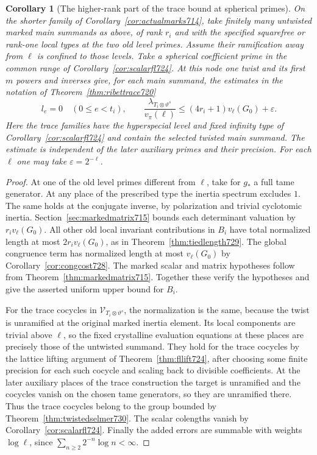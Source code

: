 \documentclass[a4paper,11pt]{article}
\newtheorem{corollary}[proposition]{Corollary}
\theoremstyle{definition}
\theoremstyle{remark}
\numberwithin{equation}{section}
\begin{document}
\begin{corollary}[The higher-rank part of the trace bound at spherical primes]
\leavevmode\label{cor:maincost730}
On the shorter family of Corollary~\ref{cor:actualmarks714}, take
finitely many untwisted marked main summands as above, of rank \(r_i\)
and with the specified squarefree or rank-one local types at the two
old level primes. Assume their ramification away from \(\ell\) is
confined to those levels. Take a spherical coefficient prime in
the common range of Corollary~\ref{cor:scalarfl724}. At this node
one twist and its first \(m\) powers and inverses give, for each main
summand, the estimates in the notation of Theorem~\ref{thm:ribettrace720}
\[
    l_e=0\quad(0\le e<t_i),\qquad
    \frac{\lambda_{T_i\otimes\vartheta^s}}{v_\pi(\ell)}
             \le (4r_i+1)v_\ell(G_0)+\varepsilon .
\]
Here the trace families have the hyperspecial level and fixed
infinity type of Corollary~\ref{cor:scalarfl724} and contain the
selected twisted main summand. The estimate is independent of the
later auxiliary primes and their precision. For each \(\ell\) one
may take \(\varepsilon=2^{-\ell}\).
\end{corollary}
\begin{proof}
At one of the old level primes different from \(\ell\), take for
\(g_*\) a full tame generator. At any place of the prescribed type
the inertia spectrum excludes \(1\). The same holds at the
conjugate inverse, by polarization and trivial cyclotomic inertia.
Section~\ref{sec:markedmatrix715} bounds each determinant valuation
by \(r_i v_\ell(G_0)\). All other old local invariant contributions
in \(B_i\) have total normalized length at most
\(2r_i v_\ell(G_0)\), as in Theorem~\ref{thm:tiedlength729}.
The global congruence term has normalized length at most
\(v_\ell(G_0)\) by Corollary~\ref{cor:congcost728}. The marked scalar
and matrix hypotheses follow from Theorem~\ref{thm:markedmatrix715}.
Together these verify the hypotheses and give the asserted uniform
upper bound for \(B_i\).

For the trace cocycles in \(\mathcal V_{T_i\otimes\vartheta^s}\),
the normalization is the same, because the twist is unramified at
the original marked inertia element. Its local components are trivial
above \(\ell\), so the fixed crystalline evaluation equations at these
places are precisely those of the untwisted summand. They hold for
the trace cocycles by the lattice lifting argument of
Theorem~\ref{thm:fllift724}, after choosing some finite precision
for each such cocycle and scaling back to divisible coefficients.
At the later auxiliary places of the trace construction the target is
unramified and the cocycles vanish on the chosen tame generators, so they are unramified there. Thus the trace cocycles belong
to the group bounded by Theorem~\ref{thm:twistedselmer730}.
The scalar colengths vanish by Corollary~\ref{cor:scalarfl724}.
Finally the added errors are summable with weights \(\log\ell\),
since \(\sum_{n\ge2}2^{-n}\log n<\infty\).
\end{proof}
\end{document}
